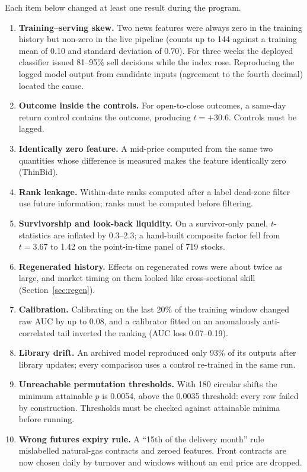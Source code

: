 Each item below changed at least one result during the program.
\begin{enumerate}
\item \textbf{Training--serving skew.} Two news features were always zero in the training history but non-zero in the live pipeline (counts up to 144 against a training mean of 0.10 and standard deviation of 0.70). For three weeks the deployed classifier issued 81--95\% sell decisions while the index rose. Reproducing the logged model output from candidate inputs (agreement to the fourth decimal) located the cause.
\item \textbf{Outcome inside the controls.} For open-to-close outcomes, a same-day return control contains the outcome, producing $t=+30.6$. Controls must be lagged.
\item \textbf{Identically zero feature.} A mid-price computed from the same two quantities whose difference is measured makes the feature identically zero (ThinBid).
\item \textbf{Rank leakage.} Within-date ranks computed after a label dead-zone filter use future information; ranks must be computed before filtering.
\item \textbf{Survivorship and look-back liquidity.} On a survivor-only panel, $t$-statistics are inflated by 0.3--2.3; a hand-built composite factor fell from $t=3.67$ to 1.42 on the point-in-time panel of 719 stocks.
\item \textbf{Regenerated history.} Effects on regenerated rows were about twice as large, and market timing on them looked like cross-sectional skill (Section~\ref{sec:regen}).
\item \textbf{Calibration.} Calibrating on the last 20\% of the training window changed raw AUC by up to 0.08, and a calibrator fitted on an anomalously anti-correlated tail inverted the ranking (AUC loss 0.07--0.19).
\item \textbf{Library drift.} An archived model reproduced only 93\% of its outputs after library updates; every comparison uses a control re-trained in the same run.
\item \textbf{Unreachable permutation thresholds.} With 180 circular shifts the minimum attainable $p$ is 0.0054, above the 0.0035 threshold: every row failed by construction. Thresholds must be checked against attainable minima before running.
\item \textbf{Wrong futures expiry rule.} A ``15th of the delivery month'' rule mislabelled natural-gas contracts and zeroed features. Front contracts are now chosen daily by turnover and windows without an end price are dropped.

\end{enumerate}
